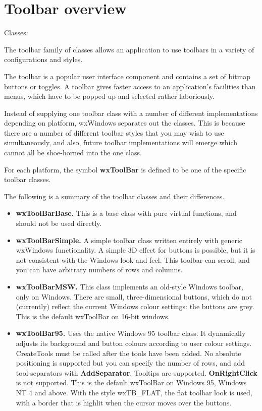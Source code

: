 \section{Toolbar overview}\label{wxtoolbaroverview}

Classes: 

The toolbar family of classes allows an application to use toolbars
in a variety of configurations and styles.

The toolbar is a popular user interface component and contains a set of bitmap
buttons or toggles. A toolbar gives faster access to an application's facilities than
menus, which have to be popped up and selected rather laboriously.

Instead of supplying one toolbar class with a number
of different implementations depending on platform, wxWindows separates
out the classes. This is because there are a number of different toolbar
styles that you may wish to use simultaneously, and also, future
toolbar implementations will emerge which
cannot all be shoe-horned into the one class.

For each platform, the symbol {\bf wxToolBar} is defined to be one of the
specific toolbar classes.

The following is a summary of the toolbar classes and their differences.

\begin{itemize}\itemsep=0pt
\item {\bf wxToolBarBase.} This is a base class with pure virtual functions,
and should not be used directly.
\item {\bf wxToolBarSimple.} A simple toolbar class written entirely with generic wxWindows
functionality. A simple 3D effect for buttons is possible, but it is not consistent
with the Windows look and feel. This toolbar can scroll, and you can have arbitrary
numbers of rows and columns.
\item {\bf wxToolBarMSW.} This class implements an old-style Windows toolbar, only on
Windows. There are small, three-dimensional buttons, which do not (currently) reflect
the current Windows colour settings: the buttons are grey. This is the default wxToolBar
on 16-bit windows.
\item {\bf wxToolBar95.} Uses the native Windows 95 toolbar class. It dynamically adjusts its
background and button colours according to user colour settings.
CreateTools must be called after the tools have been added.
No absolute positioning is supported but you can specify the number
of rows, and add tool separators with {\bf AddSeparator}.
Tooltips are supported. {\bf OnRightClick} is not supported. This is the default wxToolBar
on Windows 95, Windows NT 4 and above. With the style wxTB\_FLAT, the flat toolbar
look is used, with a border that is highlit when the cursor moves over the buttons.
\end{itemize}


